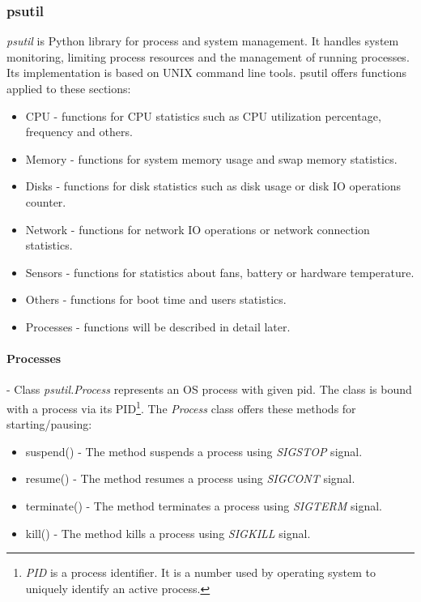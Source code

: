 \subsubsection{psutil}
\textit{psutil} is Python library for process and system management. It handles system monitoring, limiting process resources
and the management of running processes. Its implementation is based on UNIX command line tools. psutil offers functions applied
to these sections:
\begin{itemize}
\item CPU - functions for CPU statistics such as CPU utilization percentage, frequency and others. 
\item Memory - functions for system memory usage and swap memory statistics.
\item Disks - functions for disk statistics such as disk usage or disk IO operations counter.
\item Network - functions for network IO operations or network connection statistics.
\item Sensors - functions for statistics about fans, battery or hardware temperature.
\item Others - functions for boot time and users statistics.
\item Processes - functions will be described in detail later.
\end{itemize}

\paragraph{Processes} - Class \textit{psutil.Process} represents an OS
process with given pid. The class is bound with a process via its
PID\footnote{\textit{PID} is a process identifier. It is a number used by operating system to uniquely identify an active process.}. The \textit{Process} class offers these methods for
starting/pausing:
\begin{itemize}
\item suspend() - The method suspends a process using \textit{SIGSTOP} signal.
\item resume() - The method resumes a process using \textit{SIGCONT} signal.
\item terminate() - The method terminates a process using \textit{SIGTERM} signal.
\item kill() - The method kills a process using \textit{SIGKILL} signal.
\end{itemize}

